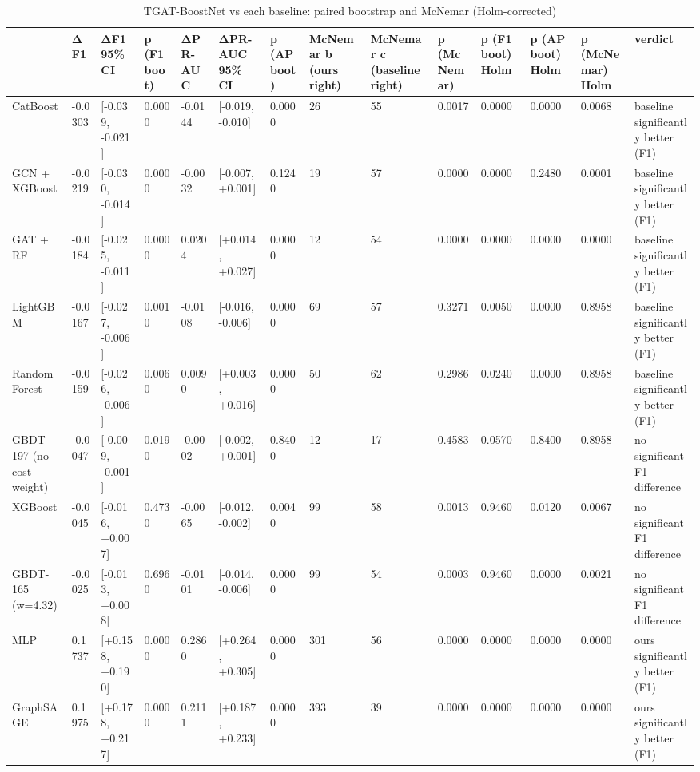 \begin{table}
\caption{TGAT-BoostNet vs each baseline: paired bootstrap and McNemar (Holm-corrected)}
\label{tab:03_significance}
\begin{tabular}{llllllllllllll}
\toprule
 & ΔF1 & ΔF1 95\% CI & p (F1 boot) & ΔPR-AUC & ΔPR-AUC 95\% CI & p (AP boot) & McNemar b (ours right) & McNemar c (baseline right) & p (McNemar) & p (F1 boot) Holm & p (AP boot) Holm & p (McNemar) Holm & verdict \\
\midrule
CatBoost & -0.0303 & [-0.039, -0.021] & 0.0000 & -0.0144 & [-0.019, -0.010] & 0.0000 & 26 & 55 & 0.0017 & 0.0000 & 0.0000 & 0.0068 & baseline significantly better (F1) \\
GCN + XGBoost & -0.0219 & [-0.030, -0.014] & 0.0000 & -0.0032 & [-0.007, +0.001] & 0.1240 & 19 & 57 & 0.0000 & 0.0000 & 0.2480 & 0.0001 & baseline significantly better (F1) \\
GAT + RF & -0.0184 & [-0.025, -0.011] & 0.0000 & 0.0204 & [+0.014, +0.027] & 0.0000 & 12 & 54 & 0.0000 & 0.0000 & 0.0000 & 0.0000 & baseline significantly better (F1) \\
LightGBM & -0.0167 & [-0.027, -0.006] & 0.0010 & -0.0108 & [-0.016, -0.006] & 0.0000 & 69 & 57 & 0.3271 & 0.0050 & 0.0000 & 0.8958 & baseline significantly better (F1) \\
Random Forest & -0.0159 & [-0.026, -0.006] & 0.0060 & 0.0090 & [+0.003, +0.016] & 0.0000 & 50 & 62 & 0.2986 & 0.0240 & 0.0000 & 0.8958 & baseline significantly better (F1) \\
GBDT-197 (no cost weight) & -0.0047 & [-0.009, -0.001] & 0.0190 & -0.0002 & [-0.002, +0.001] & 0.8400 & 12 & 17 & 0.4583 & 0.0570 & 0.8400 & 0.8958 & no significant F1 difference \\
XGBoost & -0.0045 & [-0.016, +0.007] & 0.4730 & -0.0065 & [-0.012, -0.002] & 0.0040 & 99 & 58 & 0.0013 & 0.9460 & 0.0120 & 0.0067 & no significant F1 difference \\
GBDT-165 (w=4.32) & -0.0025 & [-0.013, +0.008] & 0.6960 & -0.0101 & [-0.014, -0.006] & 0.0000 & 99 & 54 & 0.0003 & 0.9460 & 0.0000 & 0.0021 & no significant F1 difference \\
MLP & 0.1737 & [+0.158, +0.190] & 0.0000 & 0.2860 & [+0.264, +0.305] & 0.0000 & 301 & 56 & 0.0000 & 0.0000 & 0.0000 & 0.0000 & ours significantly better (F1) \\
GraphSAGE & 0.1975 & [+0.178, +0.217] & 0.0000 & 0.2111 & [+0.187, +0.233] & 0.0000 & 393 & 39 & 0.0000 & 0.0000 & 0.0000 & 0.0000 & ours significantly better (F1) \\

\end{tabular}
\end{table}
